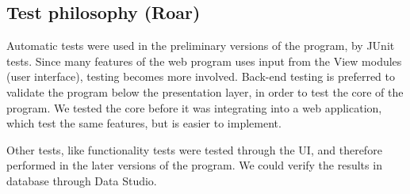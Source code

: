 \subsection{Test philosophy (Roar)}
 
Automatic tests were used in the preliminary versions of the program, by JUnit tests. Since many features of the web program uses input from the View modules (user interface), testing becomes more involved. Back-end testing is preferred to validate the program below the presentation layer, in order to test the core of the program. We tested the core before it was integrating into a web application, which test the same features, but is easier to implement.
 
Other tests, like functionality tests were tested through the UI, and therefore performed in the later versions of the program. We could verify the results in database through Data Studio.